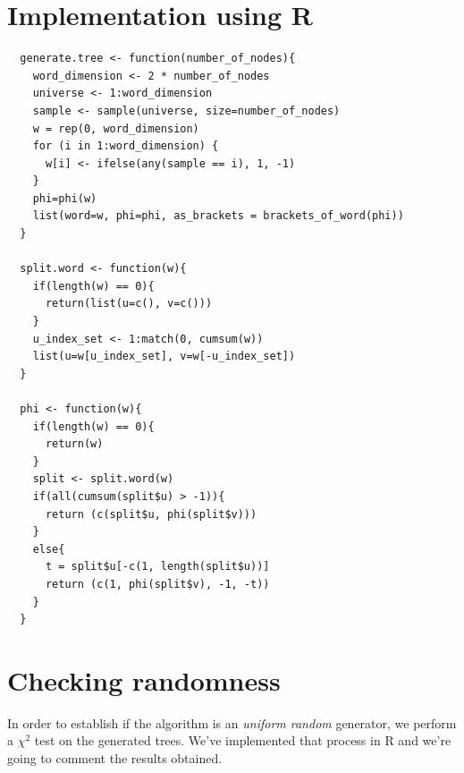 \section{Implementation using R}

\begin{lstlisting}
  generate.tree <- function(number_of_nodes){
    word_dimension <- 2 * number_of_nodes    
    universe <- 1:word_dimension
    sample <- sample(universe, size=number_of_nodes)
    w = rep(0, word_dimension)
    for (i in 1:word_dimension) {
      w[i] <- ifelse(any(sample == i), 1, -1)
    }    
    phi=phi(w)
    list(word=w, phi=phi, as_brackets = brackets_of_word(phi))
  }

  split.word <- function(w){
    if(length(w) == 0){
      return(list(u=c(), v=c()))
    }    
    u_index_set <- 1:match(0, cumsum(w))
    list(u=w[u_index_set], v=w[-u_index_set])
  }

  phi <- function(w){
    if(length(w) == 0){
      return(w)
    }    
    split <- split.word(w)     
    if(all(cumsum(split$u) > -1)){
      return (c(split$u, phi(split$v)))
    }
    else{
      t = split$u[-c(1, length(split$u))]
      return (c(1, phi(split$v), -1, -t))
    }
  }
\end{lstlisting}

\section{Checking randomness}

In order to establish if the algorithm is an \emph{uniform random}
generator, we perform a $\chi^2$ test on the generated trees. We've
implemented that process in R and we're going to comment the results
obtained.

